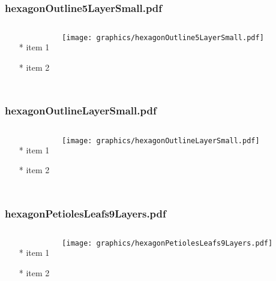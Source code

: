 \documentclass{beamer}
\begin{document}
\begin{frame} \frametitle{hexagonOutline5LayerSmall.pdf}
    \begin{columns}[c]
        \begin{itemize}
            \item[*] item 1
            \item[*] item 2
        \end{itemize}
        \begin{minipage}{\linewidth}
            \begin{center}
            \texttt{[image: graphics/hexagonOutline5LayerSmall.pdf]}
            \label{gfx:hexagonOutline5LayerSmall.pdf}
            \end{center}
        \end{minipage}
    \end{columns}
\end{frame}
\begin{frame} \frametitle{hexagonOutlineLayerSmall.pdf}
    \begin{columns}[c]
        \begin{itemize}
            \item[*] item 1
            \item[*] item 2
        \end{itemize}
        \begin{minipage}{\linewidth}
            \begin{center}
            \texttt{[image: graphics/hexagonOutlineLayerSmall.pdf]}
            \label{gfx:hexagonOutlineLayerSmall.pdf}
            \end{center}
        \end{minipage}
    \end{columns}
\end{frame}
\begin{frame} \frametitle{hexagonPetiolesLeafs9Layers.pdf}
    \begin{columns}[c]
        \begin{itemize}
            \item[*] item 1
            \item[*] item 2
        \end{itemize}
        \begin{minipage}{\linewidth}
            \begin{center}
            \texttt{[image: graphics/hexagonPetiolesLeafs9Layers.pdf]}
            \label{gfx:hexagonPetiolesLeafs9Layers.pdf}
            \end{center}
        \end{minipage}
    \end{columns}
\end{frame}
\end{document}
